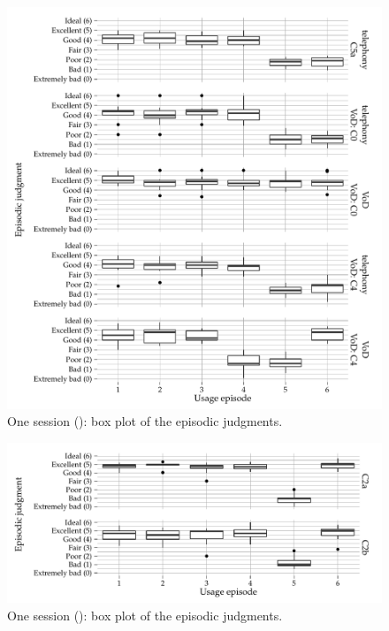 \begin{figure}[H]
	\centering
\begin{knitrout}
\color{fgcolor}
\includegraphics[width=\maxwidth]{figure/plotE2b-1} 

\end{knitrout}
	\caption[One session (\EIIb{}): box plot of the episodic judgments]{One session (\EIIb{}): box plot of the episodic judgments.}
\end{figure}

\begin{figure}[H]
	\centering
\begin{knitrout}
\color{fgcolor}
\includegraphics[width=\maxwidth]{figure/plotE3-1} 

\end{knitrout}
	\caption[One session (): box plot of the episodic judgments]{One session (): box plot of the episodic judgments.}
\end{figure}

